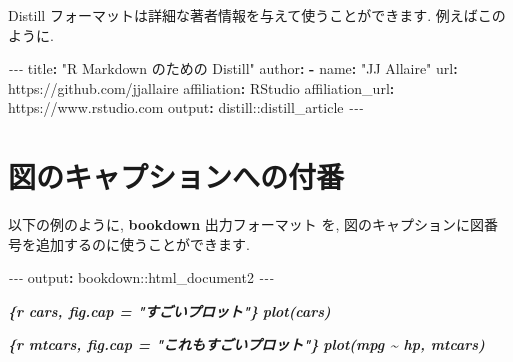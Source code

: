 \documentclass[
  11pt,
  lualatex,ja=standard,jafont=noto]{bxjsreport}
\newenvironment{Shaded}{\begin{snugshade}}{\end{snugshade}}
\newcommand{\AttributeTok}[1]{\textcolor[rgb]{0.77,0.63,0.00}{#1}}
\newcommand{\FunctionTok}[1]{\textcolor[rgb]{0.00,0.00,0.00}{#1}}
\newcommand{\InformationTok}[1]{\textcolor[rgb]{0.56,0.35,0.01}{\textbf{\textit{#1}}}}
\newcommand{\KeywordTok}[1]{\textcolor[rgb]{0.13,0.29,0.53}{\textbf{#1}}}
\newcommand{\PreprocessorTok}[1]{\textcolor[rgb]{0.56,0.35,0.01}{\textit{#1}}}
\newcommand{\StringTok}[1]{\textcolor[rgb]{0.31,0.60,0.02}{#1}}
\begin{document}
Distill フォーマットは詳細な著者情報を与えて使うことができます. 例えばこのように.

\begin{Shaded}
\begin{Highlighting}[]
\PreprocessorTok{{-}{-}{-}}
\FunctionTok{title}\KeywordTok{:}\AttributeTok{ }\StringTok{"R Markdown のための Distill"}
\FunctionTok{author}\KeywordTok{:}
\AttributeTok{  }\KeywordTok{{-}}\AttributeTok{ }\FunctionTok{name}\KeywordTok{:}\AttributeTok{ }\StringTok{"JJ Allaire"}
\AttributeTok{    }\FunctionTok{url}\KeywordTok{:}\AttributeTok{ https://github.com/jjallaire}
\AttributeTok{    }\FunctionTok{affiliation}\KeywordTok{:}\AttributeTok{ RStudio}
\AttributeTok{    }\FunctionTok{affiliation\_url}\KeywordTok{:}\AttributeTok{ https://www.rstudio.com}
\FunctionTok{output}\KeywordTok{:}\AttributeTok{ distill::distill\_article}
\PreprocessorTok{{-}{-}{-}}
\end{Highlighting}
\end{Shaded}

\hypertarget{figure-number}{%
\section{図のキャプションへの付番}\label{figure-number}}

以下の例のように, \textbf{bookdown} \autocite{R-bookdown} 出力フォーマット を, 図のキャプションに図番号を追加するのに使うことができます.

\begin{Shaded}
\begin{Highlighting}[]
\PreprocessorTok{{-}{-}{-}}
\FunctionTok{output}\KeywordTok{:}\AttributeTok{ bookdown::html\_document2}
\PreprocessorTok{{-}{-}{-}}
\end{Highlighting}
\end{Shaded}

\begin{Shaded}
\begin{Highlighting}[]
\InformationTok{\textasciigrave{}\textasciigrave{}\textasciigrave{}\{r cars, fig.cap = "すごいプロット"\}}
\InformationTok{plot(cars)}
\InformationTok{\textasciigrave{}\textasciigrave{}\textasciigrave{}}

\InformationTok{\textasciigrave{}\textasciigrave{}\textasciigrave{}\{r mtcars, fig.cap = "これもすごいプロット"\}}
\InformationTok{plot(mpg \textasciitilde{} hp, mtcars)}
\InformationTok{\textasciigrave{}\textasciigrave{}\textasciigrave{}}
\end{Highlighting}
\end{Shaded}
\end{document}
